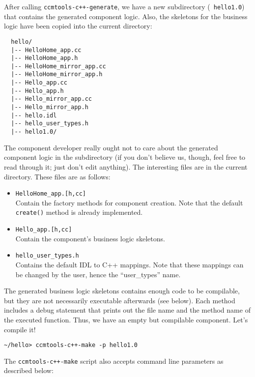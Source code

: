 After calling {\tt ccmtools-c++-generate}, we have a new subdirectory ({\tt
hello1.0}) that contains the generated component logic. Also, the skeletons for
the business logic have been copied into the current directory:
\begin{small}
\begin{verbatim}
  hello/
  |-- HelloHome_app.cc
  |-- HelloHome_app.h
  |-- HelloHome_mirror_app.cc
  |-- HelloHome_mirror_app.h
  |-- Hello_app.cc
  |-- Hello_app.h
  |-- Hello_mirror_app.cc
  |-- Hello_mirror_app.h
  |-- hello.idl
  |-- hello_user_types.h
  |-- hello1.0/
\end{verbatim}
\end{small}

The component developer really ought not to care about the generated component
logic in the subdirectory (if you don't believe us, though, feel free to read
through it; just don't edit anything). The interesting files are in the current
directory. These files are as follows:

\begin{itemize}
\item {\tt HelloHome\_app.[h,cc]} \\
Contain the factory methods for component creation. Note that the default {\tt
create()} method is already implemented.
\item {\tt Hello\_app.[h,cc]} \\
Contain the component's business logic skeletons.
\item {\tt hello\_user\_types.h} \\
Contains the default IDL to C++ mappings. Note that these mappings can be
changed by the user, hence the ``user\_types'' name.
\end{itemize}

The generated business logic skeletons contains enough code to be compilable,
but they are not necessarily executable afterwards (see below). Each method
includes a debug statement that prints out the file name and the method name of
the executed function. Thus, we have an empty but compilable component. Let's
compile it!
\begin{small}
\begin{verbatim}
~/hello> ccmtools-c++-make -p hello1.0
\end{verbatim}
\end{small}

The {\tt ccmtools-c++-make} script also accepts command line parameters as
described below:

